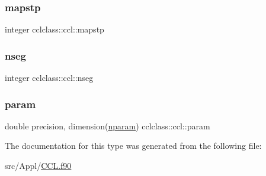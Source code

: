 \mbox{\label{structcclclass_1_1ccl_a5d663b5eeafc5a924cfe6383143f9b0a}} 
\subsubsection{\texorpdfstring{mapstp}{mapstp}}
{\footnotesize\ttfamily integer cclclass\+::ccl\+::mapstp}

\mbox{\label{structcclclass_1_1ccl_a37e0a279ff69258948ddecf0a4c78045}} 
\subsubsection{\texorpdfstring{nseg}{nseg}}
{\footnotesize\ttfamily integer cclclass\+::ccl\+::nseg}

\mbox{\label{structcclclass_1_1ccl_a4b800d069f005c436b2295924f8f7bb9}} 
\subsubsection{\texorpdfstring{param}{param}}
{\footnotesize\ttfamily double precision, dimension(\mbox{\hyperlink{namespacecclclass_adeb399ff41e54cda7bdefa51063c0de6}{nparam}}) cclclass\+::ccl\+::param}



The documentation for this type was generated from the following file\+:\begin{DoxyCompactItemize}
\item 
src/\+Appl/\mbox{\hyperlink{_c_c_l_8f90}{C\+C\+L.\+f90}}\end{DoxyCompactItemize}
